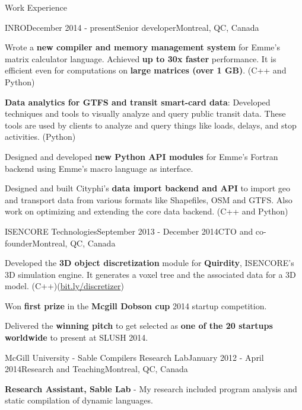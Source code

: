 \documentclass{resume} %
\begin{document}
\begin{rSection}{Work Experience}
\begin{rSubsection}{INRO}{December 2014 - present}{Senior developer}{Montreal,
        QC, Canada}
        
\item Wrote a \textbf{new compiler and memory management system} for Emme's
        matrix calculator language. Achieved \textbf{up to 30x faster}
        performance. It is efficient even for computations on \textbf{large
        matrices (over 1 GB)}.  (C++ and Python)
\item \textbf{Data analytics for GTFS and transit smart-card data}: Developed
        techniques and tools to visually analyze and query public transit data.
        These tools are used by clients to analyze and query things like loads,
        delays, and stop activities. (Python)
\item Designed and developed \textbf{new Python API modules} for Emme's Fortran
        backend using Emme's macro language as interface. 
\item Designed and built Cityphi's \textbf{data import backend and API} to
        import geo and transport data from various formats like Shapefiles, OSM
        and GTFS.  Also work on optimizing and extending the core data backend.
        (C++ and Python)
\end{rSubsection}

\begin{rSubsection}{ISENCORE Technologies}{September 2013 - December 2014}{CTO
        and co-founder}{Montreal, QC, Canada}
\item Developed the \textbf{3D object discretization} module for
        \textbf{Quirdity}, ISENCORE's 3D simulation engine. It generates a
        voxel tree and the associated data for a 3D model.
        (C++)(\href{http://bit.ly/discretizer}{bit.ly/discretizer})
\item Won \textbf{first prize} in the \textbf{Mcgill Dobson cup} 2014 startup
        competition. 
\item Delivered the \textbf{winning pitch} to get selected as \textbf{one of
        the 20 startups worldwide} to present at SLUSH 2014.
\end{rSubsection}

\begin{rSubsection}{McGill University - Sable Compilers Research Lab}{January
        2012 - April 2014}{Research and Teaching}{Montreal, QC, Canada} 
\item \textbf{Research Assistant, Sable Lab} - My research included program
        analysis and static compilation of dynamic languages.


\end{rSubsection}
\end{rSection}
\end{document}
